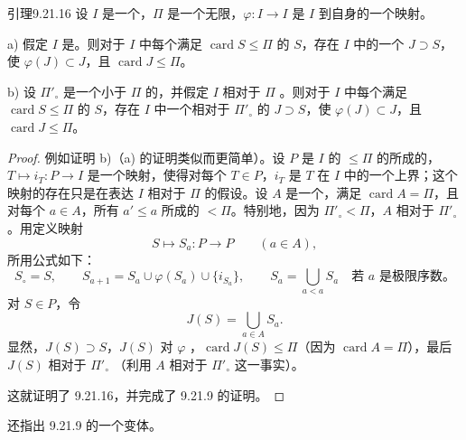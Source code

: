\begin{SGAresult}{引理}{9.21.16}
设 $I$ 是一个，$\Pi$ 是一个无限，$\varphi:I\to I$ 是 $I$ 到自身的一个映射。

a) 假定 $I$ 是。则对于 $I$ 中每个满足 $\operatorname{card}S\leq\Pi$ 的 $S$，存在 $I$ 中的一个 $J\supset S$，使 $\varphi(J)\subset J$，且 $\operatorname{card}J\leq\Pi$。

b) 设 $\Pi'_\circ$ 是一个小于 $\Pi$ 的，并假定 $I$ 相对于 $\Pi$ 。则对于 $I$ 中每个满足 $\operatorname{card}S\leq\Pi$ 的 $S$，存在 $I$ 中一个相对于 $\Pi'_\circ$  的 $J\supset S$，使 $\varphi(J)\subset J$，且 $\operatorname{card}J\leq\Pi$。
\end{SGAresult}
\begin{proof}
例如证明 b)（a) 的证明类似而更简单）。设 $P$ 是 $I$ 的 $\leq\Pi$ 的所成的，$T\mapsto i_T:P\to I$ 是一个映射，使得对每个 $T\in P$，$i_T$ 是 $T$ 在 $I$ 中的一个上界；这个映射的存在只是在表达 $I$ 相对于 $\Pi$  的假设。设 $A$ 是一个，满足 $\operatorname{card}A=\Pi$，且对每个 $a\in A$，所有 $a'\leq a$ 所成的 $<\Pi$。特别地，因为 $\Pi'_\circ<\Pi$，$A$ 相对于 $\Pi'_\circ$ 。用定义映射
\[
S\longmapsto S_a:P\longrightarrow P\qquad(a\in A),
\]
所用公式如下：
\[
S_\circ=S,\qquad S_{a+1}=S_a\cup\varphi(S_a)\cup\{i_{S_a}\},
\qquad S_a=\bigcup_{a<a}S_a\quad\text{若 }a\text{ 是极限序数。}
\]
对 $S\in P$，令
\[
J(S)=\bigcup_{a\in A}S_a.
\]
显然，$J(S)\supset S$，$J(S)$ 对 $\varphi$ ，$\operatorname{card}J(S)\leq\Pi$（因为 $\operatorname{card}A=\Pi$），最后 $J(S)$ 相对于 $\Pi'_\circ$ （利用 $A$ 相对于 $\Pi'_\circ$  这一事实）。

这就证明了 9.21.16，并完成了 9.21.9 的证明。
\end{proof}

还指出 9.21.9 的一个变体。

